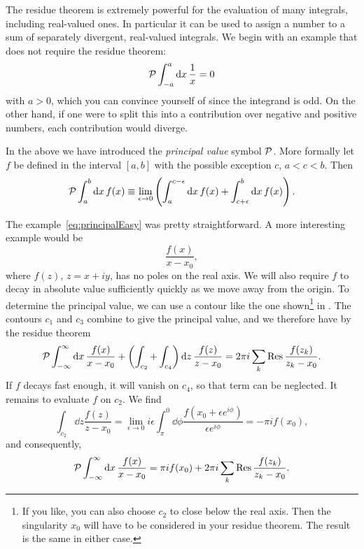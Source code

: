 The residue theorem is extremely powerful for the evaluation of many integrals,
including real-valued ones. In particular it can be used to assign a number to
a sum of separately divergent, real-valued integrals. 
We begin with an example 
that does not require the residue theorem:
\begin{equation}\label{eq:principalEasy}
  \mathcal{P}\int_{-a}^a\dd{x}\frac{1}{x}=0
\end{equation} 
with $a>0$, which you can convince yourself of since the integrand is odd. On
the other hand, if one were to split this into a contribution over negative and
positive numbers, each contribution would diverge.

In the above we have introduced the {\it principal value}
symbol $\mathcal{P}$. More formally let $f$ be defined in the interval $[a,b]$
with the possible exception $c$, $a<c<b$. Then 
\begin{equation}
  \mathcal{P}\int_a^b\dd{x}f(x)\equiv\lim_{\epsilon\to0}
     \left(\int_a^{c-\epsilon}\dd{x}f(x)+\int_{c+\epsilon}^b\dd{x}f(x)\right).
\end{equation}

The example~\eqref{eq:principalEasy} was pretty straightforward. A more
interesting example would be
\begin{equation}
  \frac{f(x)}{x-x_0},
\end{equation}
where $f(z)$, $z=x+iy$, has no poles on the real axis. We will also require $f$
to decay in absolute value sufficiently quickly as we move away from the origin.
To determine the principal value, we can use a contour like the one
shown\footnote{If you like, you can also choose $c_2$ to close below the real
axis. Then the singularity $x_0$ will have to be considered in your residue
theorem. The result is the same in either case.}
in . The contours $c_1$ and $c_3$ combine to give
the principal value, and we therefore have by the residue theorem
\begin{equation}
  \principal\int_{-\infty}^{\infty}\dd{x}\frac{f(x)}{x-x_0}
   +\left(\int_{c_2}+\int_{c_4}\right)\dd{z}\frac{f(z)}{z-x_0}
   =2\pi i\sum_k\Res \frac{f(z_k)}{z_k-x_0}. 
\end{equation}
If $f$ decays fast enough, it will vanish on $c_4$, so that term can be
neglected. It remains to evaluate $f$ on $c_2$. We find
\begin{equation}
 \int_{c_2}\dd{z}\frac{f(z)}{z-x_0}
  =\lim_{\epsilon\to0}i\epsilon\int_\pi^0\dd{\phi}
      \frac{f(x_0+\epsilon e^{i\phi})}{\epsilon e^{i\phi}}=-\pi i f(x_0),
\end{equation}
and consequently,
\begin{equation}
  \principal\int_{-\infty}^{\infty}\dd{x}\frac{f(x)}{x-x_0}
   =\pi i f(x_0)+2\pi i\sum_k\Res \frac{f(z_k)}{z_k-x_0}. 
\end{equation}

